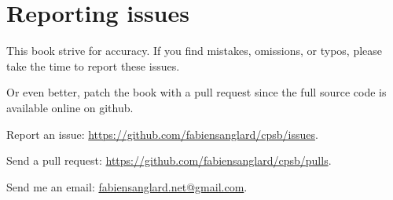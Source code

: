 \chapter{Reporting issues}
This book strive for accuracy. If you find mistakes, omissions, or typos, please take the time to report these issues. 

Or even better, patch the book with a pull request since the full source code is available online on github.


Report an issue: \href{https://github.com/fabiensanglard/cpsb/issues}{https://github.com/fabiensanglard/cpsb/issues}.

Send a pull request: \href{https://github.com/fabiensanglard/cpsb/pulls}{https://github.com/fabiensanglard/cpsb/pulls}.

Send me an email: \href{mailto:fabiensanglard.net@gmail.com}{fabiensanglard.net@gmail.com}.
